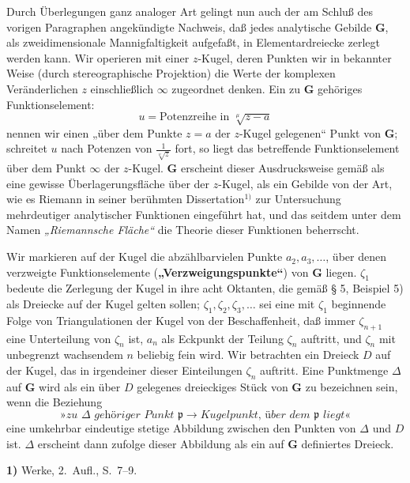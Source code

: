 \documentclass{article}
\begin{document}
Durch Überlegungen ganz analoger Art gelingt nun auch der am Schluß des vorigen Paragraphen angekündigte Nachweis, daß jedes analytische Gebilde $\mathbf{G}$, als zweidimensionale Mannigfaltigkeit aufgefaßt, in Elementardreiecke zerlegt werden kann. Wir operieren mit einer $z$-Kugel, deren Punkten wir in bekannter Weise (durch stereographische Projektion) die Werte der komplexen Veränderlichen $z$ einschließlich $\infty$ zugeordnet denken. Ein zu $\mathbf{G}$ gehöriges Funktionselement:
\[
u = \text{Potenzreihe in } \sqrt[\mu]{z - a}
\]
nennen wir einen „über dem Punkte $z = a$ der $z$-Kugel gelegenen“ Punkt von $\mathbf{G}$; schreitet $u$ nach Potenzen von $\frac{1}{\sqrt[\nu]{z}}$ fort, so liegt das betreffende Funktionselement über dem Punkt $\infty$ der $z$-Kugel. $\mathbf{G}$ erscheint dieser Ausdrucksweise gemäß als eine gewisse Überlagerungsfläche über der $z$-Kugel, als ein Gebilde von der Art, wie es Riemann in seiner berühmten Dissertation${}^{1)}$ zur Untersuchung mehrdeutiger analytischer Funktionen eingeführt hat, und das seitdem unter dem Namen \emph{„Riemannsche Fläche“} die Theorie dieser Funktionen beherrscht.

Wir markieren auf der Kugel die abzählbarvielen Punkte $a_2, a_3, \dots$, über denen verzweigte Funktionselemente (\textbf{„Verzweigungspunkte“}) von $\mathbf{G}$ liegen. $\zeta_1$ bedeute die Zerlegung der Kugel in ihre acht Oktanten, die gemäß § 5, Beispiel 5) als Dreiecke auf der Kugel gelten sollen; $\zeta_1, \zeta_2, \zeta_3, \dots$ sei eine mit $\zeta_1$ beginnende Folge von Triangulationen der Kugel von der Beschaffenheit, daß immer $\zeta_{n+1}$ eine Unterteilung von $\zeta_n$ ist, $a_n$ als Eckpunkt der Teilung $\zeta_n$ auftritt, und $\zeta_n$ mit unbegrenzt wachsendem $n$ beliebig fein wird. Wir betrachten ein Dreieck $D$ auf der Kugel, das in irgendeiner dieser Einteilungen $\zeta_n$ auftritt. Eine Punktmenge $\Delta$ auf $\mathbf{G}$ wird als ein über $D$ gelegenes dreieckiges Stück von $\mathbf{G}$ zu bezeichnen sein, wenn die Beziehung
\[
\text{»}\textit{zu }\Delta\textit{ gehöriger Punkt }\mathfrak{p} \to \textit{Kugelpunkt, über dem }\mathfrak{p}\textit{ liegt}\text{«}
\]
eine umkehrbar eindeutige stetige Abbildung zwischen den Punkten von $\Delta$ und $D$ ist. $\Delta$ erscheint dann zufolge dieser Abbildung als ein auf $\mathbf{G}$ definiertes Dreieck.

\textbf{1)} Werke, 2.\ Aufl., S.\ 7--9.
\end{document}
